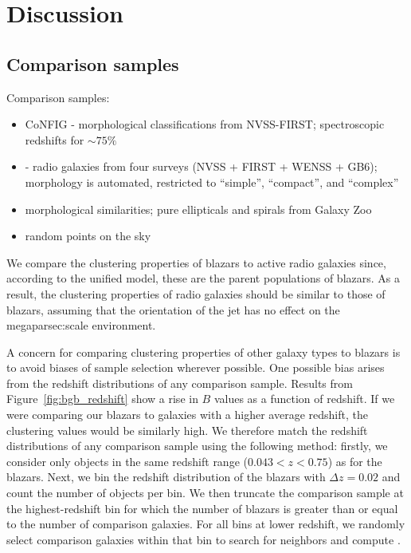 \documentclass{emulateapj}
\begin{document}

\section{Discussion}\label{sec:survey_discussion}

\subsection{Comparison samples}\label{ssec:comparison}

Comparison samples:

\begin{itemize}
    \item CoNFIG \citep{gen08} - morphological classifications from NVSS-FIRST; spectroscopic redshifts for $\sim75\%$
    \item \citet{kim08} - radio galaxies from four surveys (NVSS + FIRST + WENSS + GB6); morphology is automated, restricted to ``simple'', ``compact'', and ``complex''
    \item morphological similarities; pure ellipticals and spirals from Galaxy Zoo
    \item random points on the sky 
\end{itemize}

We compare the clustering properties of blazars to active radio galaxies since, according to the unified model, these are the parent populations of blazars. As a result, the clustering properties of radio galaxies should be similar to those of blazars, assuming that the orientation of the jet has no effect on the megaparsec:scale environment. 

A concern for comparing clustering properties of other galaxy types to blazars is to avoid biases of sample selection wherever possible. One possible bias arises from the redshift distributions of any comparison sample. Results from Figure~\ref{fig:bgb_redshift} show a rise in $B$ values as a function of redshift. If we were comparing our blazars to galaxies with a higher average redshift, the clustering values would be similarly high. We therefore match the redshift distributions of any comparison sample using the following method: firstly, we consider only objects in the same redshift range ($0.043<z<0.75$) as for the blazars. Next, we bin the redshift distribution of the blazars with $\Delta z=0.02$ and count the number of objects per bin. We then truncate the comparison sample at the highest-redshift bin for which the number of blazars is greater than or equal to the number of comparison galaxies. For all bins at lower redshift, we randomly select comparison galaxies within that bin to search for neighbors and compute \bgb. 
\end{document}
